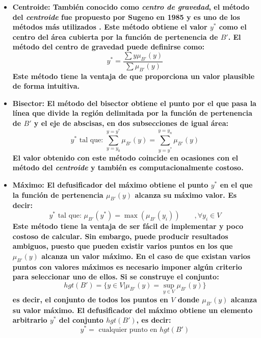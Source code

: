\begin{itemize}
  \item\bfseries Centroide: \normalfont También conocido como \emph{centro de gravedad}, el método del \emph{centroide} fue propuesto por Sugeno en 1985 y es uno de los métodos más utilizados \cite{lee1990}. Este método obtiene el valor $y^*$ como el centro del área cubierta por la función de pertenencia de $B'$. El método del centro de gravedad puede definirse como:
  \begin{equation}
	y^* = \frac{\sum y \mu_{B'}(y)}{\sum \mu_{B'}(y)}
  \end{equation}
  Este método tiene la ventaja de que proporciona un valor plausible de forma intuitiva.
  \item\bfseries Bisector: \normalfont El método del bisector obtiene el punto por el que pasa la línea que divide la región delimitada por la función de pertenencia de $B'$ y el eje de abscisas, en dos subsecciones de igual área:
  \begin{equation}
	y^*\text{ tal que: } \sum\limits_{y=y_0}^{y=y^*}\mu_{B'}(y) = \sum\limits_{y=y^*}^{y=y_n}\mu_{B'}(y)
  \end{equation}
  El valor obtenido con este método coincide en ocasiones con el método del \emph{centroide} y también es computacionalmente costoso.
  \item\bfseries Máximo: \normalfont El defusificador del máximo obtiene el punto $y^*$ en el que la función de pertenencia $\mu_{B'}(y)$ alcanza su máximo valor. Es decir:
  \begin{equation}
	y^*\text{ tal que: } \mu_{B'}(y^*) = \max(\mu_{B'}(y_{i}))\qquad ,\forall y_{i} \in V
  \end{equation}
  Este método tiene la ventaja de ser fácil de implementar y poco costoso de calcular. Sin embargo, puede producir resultados ambiguos, puesto que pueden existir varios puntos en los que $\mu_{B'}(y)$ alcanza un valor máximo. En el caso de que existan varios puntos con valores máximos es necesario imponer algún criterio para seleccionar uno de ellos. Si se construye el conjunto:
  \begin{equation}
	hgt(B') = \{y \in V | \mu_{B'}(y) = \sup\limits_{y \in V}\mu_{B'}(y)\}
  \end{equation}
  es decir, el conjunto de todos los puntos en $V$ donde $\mu_{B'}(y)$ alcanza su valor máximo. El defusificador del máximo obtiene un elemento arbitrario $y^*$ del conjunto $hgt(B')$, es decir:
  \begin{equation}
	y^* = \text{ cualquier punto en } hgt(B')

\end{equation}
\end{itemize}
